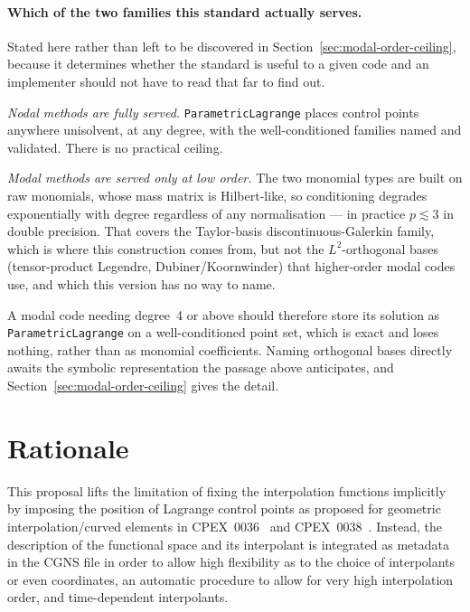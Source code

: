 \documentclass[11pt,letterpaper]{article}
\newenvironment{v2quote}
  {\begin{v2quoteframe}%
   \noindent{\footnotesize\sffamily\bfseries\color{cgnsblue}v2 text}%
   \nopagebreak\par\nopagebreak\vspace{0.15em}}
  {\end{v2quoteframe}}
\newif\ifvfourdraft
\newenvironment{v4block}{\ifvfourdraft\color{v4violet}\fi\ignorespaces}{\par}
\newcommand{\vfourmark}{\ifvfourdraft\textcolor{v4violet}{\textbf{[v4]}}\ \fi}
\begin{document}
\begin{v4block}
\paragraph{\vfourmark Which of the two families this standard actually serves.}
Stated here rather than left to be discovered in Section~\ref{sec:modal-order-ceiling},
because it determines whether the standard is useful to a given code and an
implementer should not have to read that far to find out.

\emph{Nodal methods are fully served.}  \texttt{ParametricLagrange} places control
points anywhere unisolvent, at any degree, with the well-conditioned families named
and validated.  There is no practical ceiling.

\emph{Modal methods are served only at low order.}  The two monomial types are
built on raw monomials, whose mass matrix is Hilbert-like, so conditioning degrades
exponentially with degree regardless of any normalisation --- in practice
$p \lesssim 3$ in double precision.  That covers the Taylor-basis
discontinuous-Galerkin family, which is where this construction comes from, but not
the $L^2$-orthogonal bases (tensor-product Legendre, Dubiner/Koornwinder) that
higher-order modal codes use, and which this version has no way to name.

A modal code needing degree~4 or above should therefore store its solution as
\texttt{ParametricLagrange} on a well-conditioned point set, which is exact and
loses nothing, rather than as monomial coefficients.  Naming orthogonal bases
directly awaits the symbolic representation the passage above anticipates, and
Section~\ref{sec:modal-order-ceiling} gives the detail.
\end{v4block}


\section{Rationale}
\label{sec:rationale}

\begin{v2quote}
This proposal lifts the limitation of fixing the interpolation functions implicitly by imposing
the position of Lagrange control points as proposed for geometric interpolation/curved elements in
CPEX~0036~\cite{CPEX0036} and CPEX~0038~\cite{CPEX0038}.  Instead, the description of the functional space and its interpolant is
integrated as metadata in the CGNS file in order to allow high flexibility as to the choice of
interpolants or even coordinates, an automatic procedure to allow for very high interpolation
order, and time-dependent interpolants.
\end{v2quote}
\end{document}
